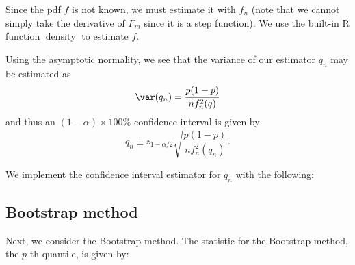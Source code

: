 \documentclass[
  11pt,
]{article}
\newenvironment{Shaded}{\begin{snugshade}}{\end{snugshade}}
\newcommand{\AttributeTok}[1]{\textcolor[rgb]{0.13,0.29,0.53}{#1}}
\newcommand{\ControlFlowTok}[1]{\textcolor[rgb]{0.13,0.29,0.53}{\textbf{#1}}}
\newcommand{\DecValTok}[1]{\textcolor[rgb]{0.00,0.00,0.81}{#1}}
\newcommand{\FunctionTok}[1]{\textcolor[rgb]{0.13,0.29,0.53}{\textbf{#1}}}
\newcommand{\NormalTok}[1]{#1}
\newcommand{\OtherTok}[1]{\textcolor[rgb]{0.56,0.35,0.01}{#1}}
\newcommand{\SpecialCharTok}[1]{\textcolor[rgb]{0.81,0.36,0.00}{\textbf{#1}}}
\newcommand{\StringTok}[1]{\textcolor[rgb]{0.31,0.60,0.02}{#1}}
\begin{document}
Since the pdf \(f\) is not known, we must estimate it with \(f_n\) (note
that we cannot simply take the derivative of \(F_m\) since it is a step
function). We use the built-in R function \(\operatorname{density}\) to
estimate \(f\).

Using the asymptotic normality, we see that the variance of our
estimator \(q_n\) may be estimated as \[
  \var(q_n) = \frac{p(1-p)}{n f_n^2(q)}
\] and thus an \((1-\alpha) \times 100\%\) confidence interval is given
by \[
  q_n \pm z_{1-\alpha/2} \sqrt{\frac{p(1-p)}{n f_n^2(q_n)}}.
\]

We implement the confidence interval estimator for \(q_n\) with the
following:

\begin{Shaded}
\end{Shaded}

\hypertarget{bootstrap-method}{%
\subsection{Bootstrap method}\label{bootstrap-method}}

Next, we consider the Bootstrap method. The statistic for the Bootstrap
method, the \(p\)-th quantile, is given by:
\end{document}
